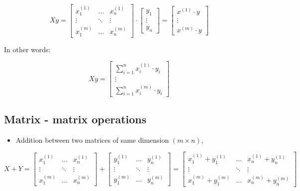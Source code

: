 \begin{equation*}
  X y = 
  \begin{bmatrix}
    x^{(1)}_{1} & \dots& x^{(1)}_n \\ 
    \vdots & \ddots & \vdots \\ 
    x^{(m)}_1 & \dots & x^{(m)}_n
  \end{bmatrix}  
  \cdot
  \begin{bmatrix} 
    y_1 \\
    \vdots \\ 
    y_n 
  \end{bmatrix} 
  = 
  \begin{bmatrix}
    x^{(1)} \cdot y \\
    \vdots \\
    x^{(m)} \cdot y
  \end{bmatrix}
\end{equation*}


In other words:

$$
X y =
\begin{bmatrix}
  \sum_{i = 1}^{n} x_{i}^{(1)} \cdot y_i \\
  \vdots \\
 \sum_{i = 1}^{n} x_{i}^{(m)} \cdot y_i
\end{bmatrix}
$$

\subsection*{Matrix - matrix operations}
\begin{itemize}
  \item Addition between two matrices of same dimension $(m \times n)$,
\end{itemize}

$$
X + Y = 
\begin{bmatrix}
  x_{1}^{(1)} & \dots & x_{n}^{(1)} \\
  \vdots & \ddots & \vdots \\ 
  x_{1}^{(m)} & \dots & x_{n}^{(m)} 
\end{bmatrix} +  
\begin{bmatrix}
  y_{1}^{(1)} & \dots & y_{n}^{(1)}  \\
  \vdots & \ddots & \vdots \\
  y_{1}^{(m)} & \dots & y_{n}^{(m)} 
\end{bmatrix} = 
\begin{bmatrix}
  x_{1}^{(1)} + y_{1}^{(1)}  & \dots & x_{n}^{(1)} + y_{n}^{(1)}  \\
  \vdots & \ddots & \vdots \\
  x_{1}^{(m)} + y_{1}^{(m)} & \dots & x_{n}^{(m)} + y_{n}^{(m)}
\end{bmatrix}
$$

